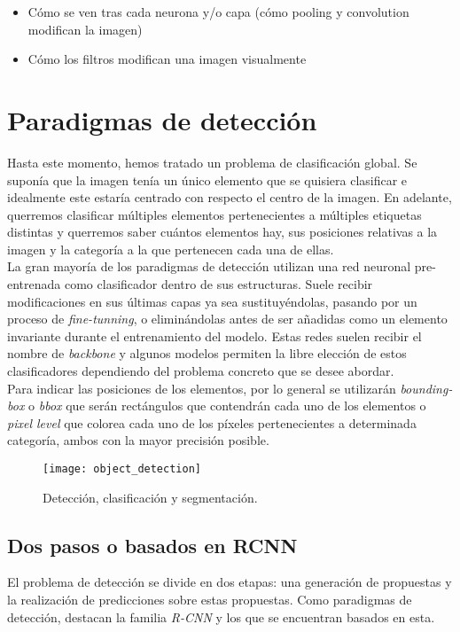 \begin{itemize}
\item Cómo se ven tras cada neurona y/o capa (cómo pooling y convolution modifican la imagen)
\item Cómo los filtros modifican una imagen visualmente
\end{itemize}

\chapter{Paradigmas de detección}
Hasta este momento, hemos tratado un problema de clasificación global. Se suponía que la imagen tenía un único elemento que se quisiera clasificar e idealmente este estaría centrado con respecto el centro de la imagen. En adelante, querremos clasificar múltiples elementos pertenecientes a múltiples etiquetas distintas y querremos saber cuántos elementos hay, sus posiciones relativas a la imagen y la categoría a la que pertenecen cada una de ellas.\\

La gran mayoría de los paradigmas de detección utilizan una red neuronal pre-entrenada como clasificador dentro de sus estructuras. Suele recibir modificaciones en sus últimas capas ya sea sustituyéndolas, pasando por un proceso de \emph{fine-tunning}, o eliminándolas antes de ser añadidas como un elemento invariante durante el entrenamiento del modelo. Estas redes suelen recibir el nombre de \emph{backbone} y algunos modelos permiten la libre elección de estos clasificadores dependiendo del problema concreto que se desee abordar.\\

Para indicar las posiciones de los elementos, por lo general se utilizarán \emph{bounding-box} o \emph{bbox} que serán rectángulos que contendrán cada uno de los elementos o \emph{pixel level} que colorea cada uno de los píxeles pertenecientes a determinada categoría, ambos con la mayor precisión posible.

\begin{figure}[htpb]
  \centering
  \texttt{[image: object\_detection]}
  \caption{Detección, clasificación y segmentación. \cite{2019arXiv190803673W}}
  \label{fig:object-detection}
\end{figure}



\section{Dos pasos o basados en RCNN}
El problema de detección se divide en dos etapas: una generación de propuestas y la realización de predicciones sobre estas propuestas. Como paradigmas de detección, destacan la familia \emph{R-CNN} y los que se encuentran basados en esta.\\


